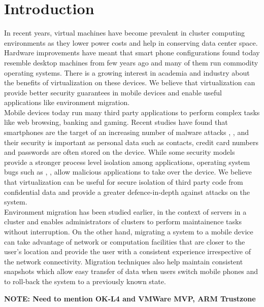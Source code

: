 \section{Introduction}
In recent years, virtual machines have become prevalent in cluster computing environments \cite{gartner2009virtual} as they lower power costs and help in conserving data center space. Hardware improvements have meant that smart phone configurations found today resemble desktop machines from few years ago and many of them run commodity operating systems. There is a growing interest in academia \cite{cox2007pocket} and industry \cite{vmware2009nextfrontier} about the benefits of virtualization on these devices. We believe that virtualization can provide better security guarantees in mobile devices and enable useful applications like environment migration. \\

Mobile devices today run many third party applications to perform complex tasks like web browsing, banking and gaming. Recent studies have found that smartphones are the target of an increasing number of malware attacks \cite{bose2006mobile},  \cite{cybercriminals2007banks},  \cite{iphone2010seriot} and their security is important as personal data such as contacts, credit card numbers and passwords are often stored on the device. While some security models \cite{androidsecurity} provide a stronger process level isolation among applications, operating system bugs such as \cite{kernel2009vulnerability}, \cite{opencore2009android}, \cite{sms2009iphone} allow malicious applications to take over the device. We believe that virtualization can be useful for secure isolation of third party code from confidential data and provide a greater defence-in-depth against attacks on the system.\\

Environment migration has been studied earlier, in the context of servers in a cluster \cite{clark2005live} and enables administrators of clusters to perform maintainence tasks without interruption. On the other hand, migrating a system to a mobile device can take advantage of network or computation facilities that are closer to the user's location and provide the user with a consistent experience irrespective of the network connectivity. Migration techniques also help maintain consistent snapshots which allow easy transfer of data when users switch mobile phones and to roll-back the system to a previously known state.

{\bf NOTE: Need to mention OK-L4 and VMWare MVP, ARM Trustzone \newline}
